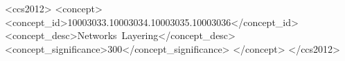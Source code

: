 \documentclass[format=acmsmall, review=false, screen=true]{acmart}
\begin{document}
%
%
\begin{CCSXML}
<ccs2012>
   <concept>
       <concept_id>10003033.10003034.10003035.10003036</concept_id>
       <concept_desc>Networks~Layering</concept_desc>
       <concept_significance>300</concept_significance>
       </concept>
 </ccs2012>
\end{CCSXML}


%
%




\maketitle

\renewcommand{\shortauthors}{M. Mameli et al.}


\end{document}
